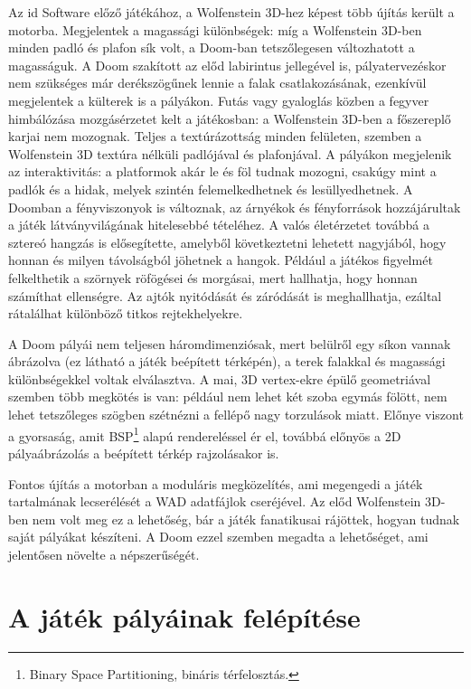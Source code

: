 \documentclass{thesis-ekf}
\theoremstyle{definition}
\begin{document}
Az id Software előző játékához, a Wolfenstein 3D-hez képest több újítás került a
motorba. Megjelentek a magassági különbségek: míg a Wolfenstein 3D-ben minden
padló és plafon sík volt, a Doom-ban tetszőlegesen változhatott a magasságuk. A
Doom szakított az előd labirintus jellegével is, pályatervezéskor nem szükséges
már derékszögűnek lennie a falak csatlakozásának, ezenkívül megjelentek a
külterek is a pályákon. Futás vagy gyaloglás közben a fegyver himbálózása
mozgásérzetet kelt a játékosban: a Wolfenstein 3D-ben a főszereplő karjai nem
mozognak. Teljes a textúrázottság minden felületen, szemben a Wolfenstein 3D
textúra nélküli padlójával és plafonjával. A pályákon megjelenik az
interaktivitás: a platformok akár le és föl tudnak mozogni, csakúgy mint a
padlók és a hidak, melyek szintén felemelkedhetnek és lesüllyedhetnek. A Doomban
a fényviszonyok is változnak, az árnyékok és fényforrások hozzájárultak a játék
látványvilágának hitelesebbé tételéhez. A valós életérzetet továbbá a sztereó
hangzás is elősegítette, amelyből következtetni lehetett nagyjából, hogy honnan
és milyen távolságból jöhetnek a hangok. Például a játékos figyelmét
felkelthetik a szörnyek röfögései és morgásai, mert hallhatja, hogy honnan
számíthat ellenségre. Az ajtók nyitódását és záródását is meghallhatja, ezáltal
rátalálhat különböző titkos rejtekhelyekre. \cite[A játék motorja]{doomgame}

A Doom pályái nem teljesen háromdimenziósak, mert belülről egy síkon vannak
ábrázolva (ez látható a játék beépített térképén), a terek falakkal és
magassági különbségekkel voltak elválasztva. A mai, 3D vertex-ekre épülő
geometriával szemben több megkötés is van: például nem lehet két szoba egymás
fölött, nem lehet tetszőleges szögben szétnézni a fellépő nagy torzulások miatt.
Előnye viszont a gyorsaság, amit BSP\footnote{Binary Space Partitioning,
bináris térfelosztás.} alapú rendereléssel ér el, továbbá előnyös a 2D
pályaábrázolás a beépített térkép rajzolásakor is.
\cite[A játék motorja]{doomgame}

Fontos újítás a motorban a moduláris megközelítés, ami megengedi a játék
tartalmának lecserélését a WAD adatfájlok cseréjével. Az előd Wolfenstein 3D-ben
nem volt meg ez a lehetőség, bár a játék fanatikusai rájöttek, hogyan tudnak
saját pályákat készíteni. A Doom ezzel szemben megadta a lehetőséget, ami
jelentősen növelte a népszerűségét. \cite[A játék motorja]{doomgame}

\section{A játék pályáinak felépítése}
\end{document}
